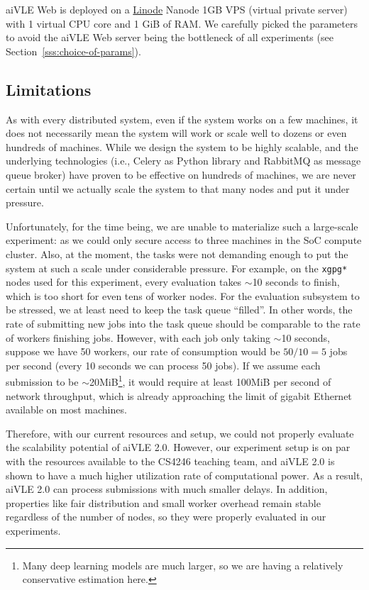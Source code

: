aiVLE Web is deployed on a \href{https://linode.com/}{Linode} Nanode 1GB VPS (virtual private server) with 1 virtual CPU core and 1 GiB of RAM. We carefully picked the parameters to avoid the aiVLE Web server being the bottleneck of all experiments (see Section~\ref{sss:choice-of-params}).

\subsection{Limitations}
\label{ss:deployment-limitations}
As with every distributed system, even if the system works on a few machines, it does not necessarily mean the system will work or scale well to dozens or even hundreds of machines. While we design the system to be highly scalable, and the underlying technologies (i.e., Celery as Python library and RabbitMQ as message queue broker) have proven to be effective on hundreds of machines, we are never certain until we actually scale the system to that many nodes and put it under pressure.

Unfortunately, for the time being, we are unable to materialize such a large-scale experiment: as we could only secure access to three machines in the SoC compute cluster. Also, at the moment, the tasks were not demanding enough to put the system at such a scale under considerable pressure. For example, on the \texttt{xgpg*} nodes used for this experiment, every evaluation takes $\sim$10 seconds to finish, which is too short for even tens of worker nodes. For the evaluation subsystem to be stressed, we at least need to keep the task queue ``filled''. In other words, the rate of submitting new jobs into the task queue should be comparable to the rate of workers finishing jobs. However, with each job only taking $\sim$10 seconds, suppose we have 50 workers, our rate of consumption would be $50/10=5$ jobs per second (every 10 seconds we can process 50 jobs). If we assume each submission to be $\sim$20MiB\footnote{Many deep learning models are much larger, so we are having a relatively conservative estimation here.}, it would require at least 100MiB per second of network throughput, which is already approaching the limit of gigabit Ethernet available on most machines.

Therefore, with our current resources and setup, we could not properly evaluate the scalability potential of aiVLE 2.0. However, our experiment setup is on par with the resources available to the CS4246 teaching team, and aiVLE 2.0 is shown to have a much higher utilization rate of computational power. As a result, aiVLE 2.0 can process submissions with much smaller delays. In addition, properties like fair distribution and small worker overhead remain stable regardless of the number of nodes, so they were properly evaluated in our experiments.

